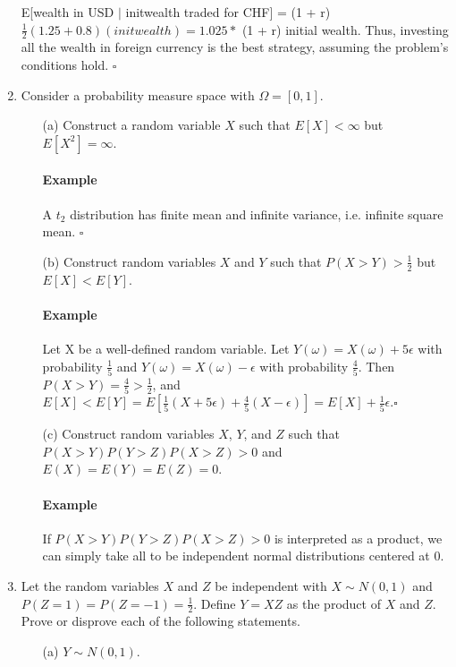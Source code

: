 \documentclass[letterpaper,12pt]{article}
\theoremstyle{definition}
\begin{document}
\begin{enumerate}
    E[wealth in USD $\vert$ initwealth traded for CHF] = (1 + r)$\frac{1}{2}  (1.25 + 0.8)(initwealth) = 1.025 *$ (1 + r) initial wealth. Thus, investing all the wealth in foreign currency is the best strategy, assuming the problem's conditions hold. $\square$
    
    
    
\item Consider a probability measure space with $\Omega = [0,1]$.
		\begin{itemize}
			\item[(a)] Construct a random variable $X$ such that $E[X] < \infty$ but $E[X^2] = \infty$.
            
         \paragraph{Example} A $t_2$ distribution has finite mean and infinite variance, i.e. infinite square mean. $\square$
         
			\item[(b)] Construct random variables $X$ and $Y$ such that $P(X>Y)>\frac{1}{2}$ but $E[X]<E[Y]$.
            
         \paragraph{Example} Let X be a well-defined random variable. Let $Y(\omega) = X(\omega) + 5 \epsilon$ with probability  $\frac{1}{5}$ and  $Y(\omega) = X(\omega) - \epsilon$ with probability  $\frac{4}{5}$. Then  $P(X>Y) = \frac{4}{5} >\frac{1}{2}$, and  $E[X]<E[Y]=E[\frac{1}{5}(X + 5\epsilon) + \frac{4}{5}(X - \epsilon)] = E[X] + \frac{1}{5}\epsilon. \square$ 
         
			\item[(c)] Construct random variables $X$, $Y$, and $Z$ such that\\ $P(X>Y) P(Y>Z) P(X>Z) > 0$ and 						$E(X)=E(Y)=E(Z)=0$.
            
        \paragraph{Example} If $P(X>Y) P(Y>Z) P(X>Z) > 0$ is interpreted as a product, we can simply take all to be independent normal distributions centered at 0. 
        
        
		\end{itemize}

	\item Let the random variables $X$ and $Z$ be independent with $X \sim N(0,1)$ and $P(Z=1)=P(Z=-1)=\frac{1}{2}$. 			Define $Y= XZ$ as the product of $X$ and $Z$. Prove or disprove each of the following statements.
		\begin{itemize}
			\item[(a)] $Y \sim N(0,1)$.

\end{itemize}
\end{enumerate}
\end{document}
